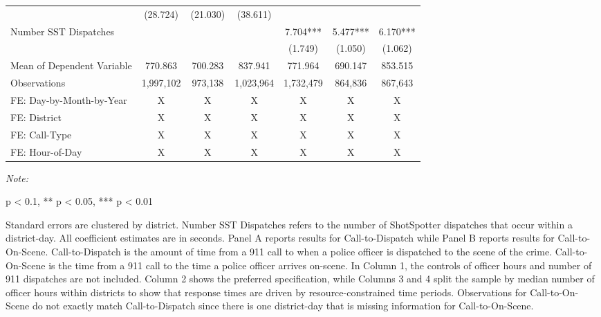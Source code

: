 \begin{table}[H]
\begin{threeparttable}
\begin{tabular}[t]{lcccccc}
\hspace{1em} & (28.724) & (21.030) & (38.611) &  &  & \\
\hspace{1em}Number SST Dispatches &  &  &  & 7.704*** & 5.477*** & 6.170***\\
\hspace{1em} &  &  &  & (1.749) & (1.050) & (1.062)\\
\hspace{1em}Mean of Dependent Variable & 770.863 & 700.283 & 837.941 & 771.964 & 690.147 & 853.515\\
\hspace{1em}Observations & 1,997,102 & 973,138 & 1,023,964 & 1,732,479 & 864,836 & 867,643\\
\midrule
FE: Day-by-Month-by-Year & X & X & X & X & X & X\\
FE: District & X & X & X & X & X & X\\
FE: Call-Type & X & X & X & X & X & X\\
FE: Hour-of-Day & X & X & X & X & X & X\\
\bottomrule
\end{tabular}
\begin{tablenotes}
\item \textit{Note: } 
\item * p < 0.1, ** p < 0.05, *** p < 0.01
\item Standard errors are clustered by district.                       Number SST Dispatches refers to the number of                      ShotSpotter dispatches that occur within a district-day.                      All coefficient estimates are in seconds. Panel A reports results for                      Call-to-Dispatch while Panel B reports results for Call-to-On-Scene.                      Call-to-Dispatch is the amount of time from a 911 call to                       when a police officer is dispatched to the scene of the crime.                      Call-to-On-Scene is the time from a 911 call to the time a police                      officer arrives on-scene. In Column 1, the controls of officer hours and number of                      911 dispatches are not included. Column 2 shows the preferred                      specification, while Columns 3 and 4 split the sample by median number                      of officer hours                      within districts to show that response times are driven by                      resource-constrained time periods. Observations for Call-to-On-Scene                      do not exactly match Call-to-Dispatch since there is one district-day                      that is missing information for Call-to-On-Scene.                   
\end{tablenotes}
\end{threeparttable}
\end{table}
